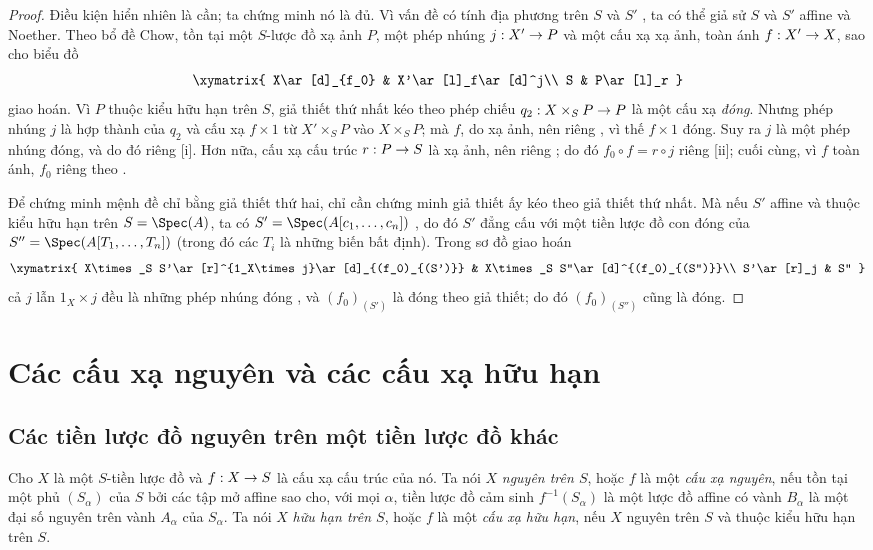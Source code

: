 \documentclass[oneside,10pt]{amsart}
\makeatletter
\newcommand{\ega@arrow}[2]{\mathchoice{#1}{#2}{#2}{#2}}
\renewcommand{\to}{\ega@arrow{\longrightarrow}{\rightarrow}}
\newcommand{\oldpage}[2][]{\marginnote{\normalfont\footnotesize\textbf{#1}~|~#2}\ignorespaces}
\let\EGAOriginalLabel\label
\renewcommand{\label}[1]{\phantomsection\EGAOriginalLabel{#1}}
\makeatother
\begin{document}
\begin{proof}
Điều kiện hiển nhiên là cần; ta chứng minh nó là đủ.
Vì vấn đề có tính địa phương trên $S$ và $S'$ , ta có thể giả sử $S$ và $S'$ affine và Noether.
Theo bổ đề Chow, tồn tại một $S$-lược đồ xạ ảnh $P$, một phép nhúng $j:X'\to P$ và một cấu xạ xạ ảnh, toàn ánh $f:X'\to X$, sao cho biểu đồ
\[
  \xymatrix{
    X\ar[d]_{f_0} &
    X'\ar[l]_f\ar[d]^j\\
    S &
    P\ar[l]_r
  }
\]
giao hoán.
Vì $P$ thuộc kiểu hữu hạn trên $S$, giả thiết thứ nhất kéo theo phép chiếu $q_2:X\times_S P\to P$ là một cấu xạ \emph{đóng}.
Nhưng phép nhúng $j$ là hợp thành của $q_2$ và cấu xạ $f\times1$ từ $X'\times_S P$ vào $X\times_S P$; mà $f$, do xạ ảnh, nên riêng , vì thế $f\times1$ đóng.
Suy ra $j$ là một phép nhúng đóng, và do đó riêng [i].
Hơn nữa, cấu xạ cấu trúc $r:P\to S$ là xạ ảnh, nên riêng ; do đó $f_0\circ f=r\circ j$ riêng [ii]; cuối cùng, vì $f$ toàn ánh, $f_0$ riêng theo .

Để chứng minh mệnh đề chỉ bằng giả thiết thứ hai, chỉ cần chứng minh giả thiết ấy kéo theo giả thiết thứ nhất.
Mà nếu $S'$ affine và thuộc kiểu hữu hạn trên $S=\Spec(A)$,
\oldpage[II]{110}
ta có $S'=\Spec(A[c_1,\ldots,c_n])$ , do đó $S'$ đẳng cấu với một tiền lược đồ con đóng của $S''=\Spec(A[T_1,\ldots,T_n])$ (trong đó các $T_i$ là những biến bất định).
Trong sơ đồ giao hoán
\[
  \xymatrix{
    X\times_S S'\ar[r]^{1_X\times j}\ar[d]_{(f_0)_{(S')}} &
    X\times_S S''\ar[d]^{(f_0)_{(S'')}}\\
    S'\ar[r]_j &
    S''
  }
\]
cả $j$ lẫn $1_X\times j$ đều là những phép nhúng đóng , và $(f_0)_{(S')}$ là đóng theo giả thiết;
do đó $(f_0)_{(S'')}$ cũng là đóng.
\end{proof}

\section{Các cấu xạ nguyên và các cấu xạ hữu hạn}
\label{section:II.6}

\subsection{Các tiền lược đồ nguyên trên một tiền lược đồ khác}
\label{subsection:II.6.1}

\begin{definition}[6.1.1]
\label{II.6.1.1}
Cho $X$ là một $S$-tiền lược đồ và $f:X\to S$ là cấu xạ cấu trúc của nó.
Ta nói $X$ \emph{nguyên trên $S$}, hoặc $f$ là một \emph{cấu xạ nguyên}, nếu tồn tại một phủ $(S_\alpha)$ của $S$ bởi các tập mở affine sao cho, với mọi $\alpha$, tiền lược đồ cảm sinh $f^{-1}(S_\alpha)$ là một lược đồ affine có vành $B_\alpha$ là một đại số nguyên trên vành $A_\alpha$ của $S_\alpha$.
Ta nói $X$ \emph{hữu hạn trên $S$}, hoặc $f$ là một \emph{cấu xạ hữu hạn}, nếu $X$ nguyên trên $S$ và thuộc kiểu hữu hạn trên $S$.
\end{definition}
\end{document}
